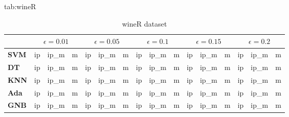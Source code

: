 \begin{table}[htbp]
\scriptsize
\floatconts
  {tab:wineR}%
  {\caption{wineR dataset}}%
  {
\begin{tabular}{cl|lll|lll|lll|lll|lll}
             && \multicolumn{3}{c|}{$\epsilon=0.01$} & \multicolumn{3}{c|}{$\epsilon=0.05$} & \multicolumn{3}{c|}{$\epsilon=0.1$} & \multicolumn{3}{c|}{$\epsilon=0.15$} & \multicolumn{3}{c}{$\epsilon=0.2$} \\
\hline
\hline
\hline

\hline
\multicolumn{2}{l|}{\textbf{SVM}} & ip         & ip\_m      & m          & ip         & ip\_m      & m          & ip         & ip\_m      & m          & ip         & ip\_m      & m          & ip         & ip\_m      & m           \\
\hline

\hline
\hline
\hline

\hline
\multicolumn{2}{l|}{\textbf{DT}}  & ip         & ip\_m      & m          & ip         & ip\_m      & m          & ip         & ip\_m      & m          & ip         & ip\_m      & m          & ip         & ip\_m      & m           \\
\hline

\hline
\hline
\hline

\hline
\multicolumn{2}{l|}{\textbf{KNN}} & ip         & ip\_m      & m          & ip         & ip\_m      & m          & ip         & ip\_m      & m          & ip         & ip\_m      & m          & ip         & ip\_m      & m           \\
\hline

\hline
\hline
\hline

\hline
\multicolumn{2}{l|}{\textbf{Ada}} & ip         & ip\_m      & m          & ip         & ip\_m      & m          & ip         & ip\_m      & m          & ip         & ip\_m      & m          & ip         & ip\_m      & m           \\
\hline

\hline
\hline
\hline

\hline
\multicolumn{2}{l|}{\textbf{GNB}} & ip         & ip\_m      & m          & ip         & ip\_m      & m          & ip         & ip\_m      & m          & ip         & ip\_m      & m          & ip         & ip\_m      & m           \\
\hline

\hline
\hline
\hline


\end{tabular}}
\end{table}
